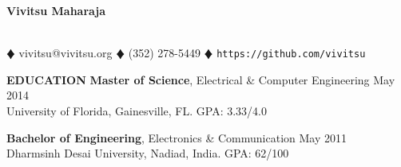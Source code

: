\documentclass[10pt, a4paper]{article}
\begin{document}
\begin{center}
\textbf{\Large Vivitsu Maharaja}
\date{}
\thispagestyle{empty}
\smallskip \\
$\vardiamond$ vivitsu@vivitsu.org $\vardiamond$ (352) 278-5449 $\vardiamond$ \texttt{https://github.com/vivitsu}
\end{center}

\textbf{EDUCATION}
\smallskip
\newline
{\bf Master of Science}, Electrical \& Computer Engineering \hfill May 2014\\
University of Florida, Gainesville, FL. \hfill GPA: 3.33/4.0

{\bf Bachelor of Engineering}, Electronics \& Communication \hfill May 2011\\
Dharmsinh Desai University, Nadiad, India. \hfill GPA: 62/100
\end{document}
